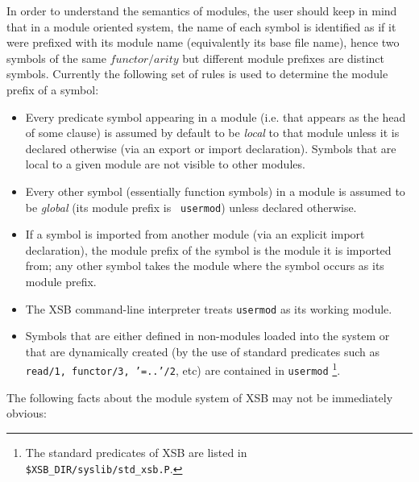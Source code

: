 In order to understand the semantics of modules, the user should keep
in mind that in a module oriented system, the name of each symbol is
identified as if it were prefixed with its module name (equivalently
its base file name), hence two symbols of the same $functor/arity$ but
different module prefixes are distinct symbols.  Currently the
following set of rules is used to determine the module prefix of a
symbol:
\begin{itemize}
\item	Every predicate symbol appearing in a module (i.e. that appears as
	the head of some clause) is assumed by default to be {\em
	local} to that module unless it is declared otherwise (via an
	export or import declaration).  Symbols that are local to a
	given module are not visible to other modules.
\item	Every other symbol (essentially function symbols) in a module is
	assumed to be {\em global} (its module prefix is {\tt
	usermod}) unless declared otherwise.
\item	If a symbol is imported from another module (via an explicit import 
	declaration), the module prefix of the symbol is the module it
	is imported from; any other symbol takes the module where the
	symbol occurs as its module prefix.
\item	The XSB command-line interpreter treats {\tt usermod} as its
working module. 
\item	Symbols that are either defined in non-modules loaded into the
	system or that are dynamically created (by the use of standard
	predicates such as {\tt read/1, functor/3, '=..'/2}, etc) are
	contained in {\tt usermod}%
\footnote{The standard predicates of XSB are listed in {\tt
\$XSB\_DIR/syslib/std\_xsb.P}.}.  
\end{itemize}
%
The following facts about the module system of XSB may not be
immediately obvious:
